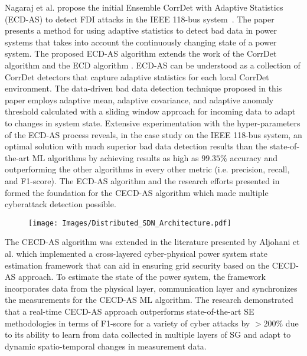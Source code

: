\documentclass[conference]{IEEEtran}
\begin{document}
Nagaraj et al. \cite{nagaraj2020ensemble} propose the initial Ensemble CorrDet with Adaptive Statistics (ECD-AS) to detect FDI attacks in the IEEE 118-bus system~\cite{dabbagchi1993power}. The paper presents a method for using adaptive statistics to detect bad data in power systems that takes into account the continuously changing state of a power system. The proposed ECD-AS algorithm extends the work of the CorrDet algorithm \cite{trevizan2019data} and the ECD algorithm \cite{ruben2020hybrid}.  ECD-AS can be understood as a collection of CorrDet detectors that capture adaptive statistics for each local CorrDet environment. The data-driven bad data detection technique proposed in this paper employs adaptive mean, adaptive covariance, and adaptive anomaly threshold calculated with a sliding window approach for incoming data to adapt to changes in system state. Extensive experimentation with the hyper-parameters of the ECD-AS process reveals, in the case study on the IEEE 118-bus system, an optimal solution with much superior bad data detection results than the state-of-the-art ML algorithms by achieving results as high as $99.35\%$ accuracy and outperforming the other algorithms in every other metric (i.e. precision, recall, and F1-score). The ECD-AS algorithm and the research efforts presented in \cite{trevizan2019data,ruben2020hybrid} formed the foundation for the CECD-AS algorithm which made multiple cyberattack detection possible.

\begin{figure}[!h]
\centering
\texttt{[image: Images/Distributed\_SDN\_Architecture.pdf]} 

\caption{}
\label{fig:SDN_arch_dist}
\end{figure}


The CECD-AS algorithm was extended in the literature presented by Aljohani  et al. \cite{aljohanicross} which implemented a cross-layered cyber-physical power system state estimation framework that can aid in ensuring grid security based on the CECD-AS approach. To estimate the state of the power system, the framework incorporates data from the physical layer, communication layer and synchronizes the measurements for the CECD-AS ML algorithm. The research demonstrated that a real-time CECD-AS approach outperforms state-of-the-art SE methodologies in terms of F1-score for a variety of cyber attacks by $> 200\%$ due to its ability to learn from data collected in multiple layers of SG and adapt to dynamic spatio-temporal changes in measurement data.
\end{document}
